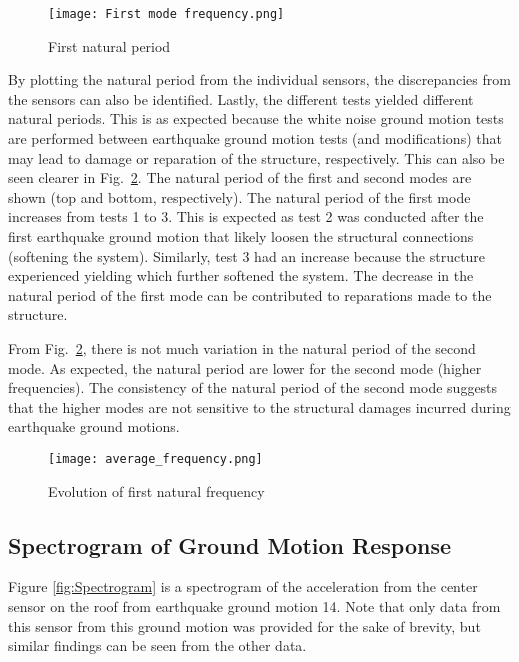 \documentclass{article}
\begin{document}
\begin{figure}[!htb]
    \centering
    \texttt{[image: First mode frequency.png]}
    \caption{First natural period}
    \label{fig:First_nat_freq}
\end{figure}

\medskip

By plotting the natural period from the individual sensors, the discrepancies from the sensors can also be identified. Lastly, the different tests yielded different natural periods. This is as expected because the white noise ground motion tests are performed between earthquake ground motion tests (and modifications) that may lead to damage or reparation of the structure, respectively. This can also be seen clearer in Fig.\ \ref{fig:Average_freq}. The natural period of the first and second modes are shown (top and bottom, respectively). The natural period of the first mode increases from tests 1 to 3. This is expected as test 2 was conducted after the first earthquake ground motion that likely loosen the structural connections (softening the system). Similarly, test 3 had an increase because the structure experienced yielding which further softened the system. The decrease in the natural period of the first mode can be contributed to reparations made to the structure.

\medskip

From Fig.\ \ref{fig:Average_freq}, there is not much variation in the natural period of the second mode. As expected, the natural period are lower for the second mode (higher frequencies). The consistency of the natural period of the second mode suggests that the higher modes are not sensitive to the structural damages incurred during earthquake ground motions.

\begin{figure}
    \centering
    \texttt{[image: average\_frequency.png]}
    \caption{Evolution of first natural frequency}
    \label{fig:Average_freq}
\end{figure}

\FloatBarrier
\subsection{Spectrogram of Ground Motion Response}

Figure \ref{fig:Spectrogram} is a spectrogram of the acceleration from the center sensor on the roof from earthquake ground motion 14. Note that only data from this sensor from this ground motion was provided for the sake of brevity, but similar findings can be seen from the other data. 
\end{document}

